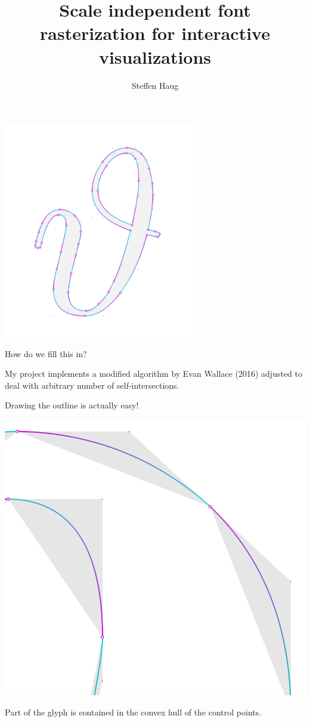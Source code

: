 \documentclass[14pt]{beamer}
\title{Scale independent font rasterization for interactive visualizations}
\author{Steffen Haug}
\date{}
\begin{document}
\begin{frame}
\titlepage
\end{frame}

\begin{frame}
    \centering
    \includegraphics[width=0.625\textwidth]{demo/curves.png}

    How do we fill this in?
\end{frame}

\begin{frame}
    \centering
    My project implements a modified algorithm by Evan Wallace (2016) adjusted to
    deal with arbitrary number of self-intersections.
\end{frame}

\begin{frame}
    \centering
    Drawing the outline is actually easy!
\end{frame}

\begin{frame}
    \centering
    \includegraphics[height=0.625\textheight]{demo/loop_blinn_regions.png}

    Part of the glyph is contained in the convex hull of the control points.
\end{frame}
\end{document}
